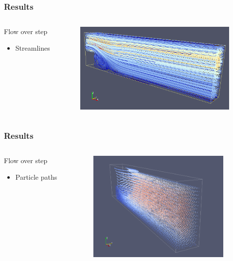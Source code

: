 \documentclass{beamer}
\begin{document}
\begin{frame}
\frametitle{Results}
\begin{columns}
\begin{column}{0.30\textwidth}
Flow over step
\begin{itemize}
\item Streamlines
\end{itemize}
\end{column}
\begin{column}{0.70\textwidth}
\includegraphics[height=4.5cm]{flowoverstep.png}
\end{column}
\end{columns}
\end{frame}

\begin{frame}
\frametitle{Results}
\begin{columns}
\begin{column}{0.33\textwidth}
Flow over step
\begin{itemize}
\item Particle paths
\end{itemize}
\end{column}
\begin{column}{0.66\textwidth}
\includegraphics[height=5.5cm]{Step-Particles.png}
\end{column}
\end{columns}
\end{frame}
\end{document}

